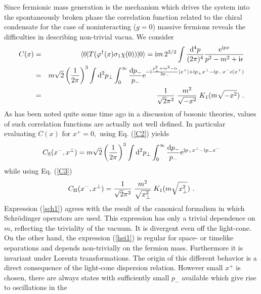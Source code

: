 \documentclass[a4paper,12pt]{article}
\begin{document}
Since fermionic mass generation is the mechanism which drives the system into the spontaneously
broken phase the correlation function related to the chiral condensate for the case of
noninteracting ($g=0$) massive fermions reveals the difficulties in describing non-trivial vacua.
We consider
\begin{eqnarray}
  \label{ corr}
  C(x)&=&\langle 0|T(\varphi^{\dagger}(x)\sigma_{1}\chi(0))| 0 \rangle= {\rm i}m\,
2^{3/2}\int \frac{{\rm d}^{4}p}{(2 \pi)^{4}}\frac{{\rm e}^{{\rm i}px}}{ p^{2} -m^{2}
+{\rm i} \epsilon}\label{C1}\\
&=&  m\sqrt{2}  \left ( \frac{1}{2\pi}
    \right )^{3} \int {\rm d}^{2} p_{\perp} \int^{\infty}_{0} \frac{{\rm d}p_{-}}{p_{-}}
{\rm e}^{- {\rm i} \frac{p^{2}_{\perp} + m^{2} - {\rm i} \epsilon}{2 p_{-}} |x^{+}|+
 {\rm i} p_{\perp}x^{\perp}-{\rm i} p_{-}x^{-} \epsilon (x^{+})}\label{C2}\\
& = &\frac{1}{\sqrt{2} \pi ^{2}} \; \frac{m^{2}}
     {\sqrt{- x^{2} }} \; K_{1} (m\sqrt{-x^{2}})\label{C3} \ .
\end{eqnarray}
As has been noted quite some time ago \cite{Nakanishi77} in a discussion of bosonic theories,
values of such correlation functions are actually not well defined. In particular  evaluating
$C(x)$ for $x^{+}=0,$  using  Eq. (\ref{C2}) yields
\begin{equation}
  \label{sch1}
C_{\rm S}(x^{-},x^{\perp})=  m\sqrt{2}  \left ( \frac{1}{2\pi}
    \right )^{3} \int {\rm d}^{2} p_{\perp} \int^{\infty}_{0} \frac{{\rm d}p_{-}}{p_{-}}
{\rm  e}^{{\rm i} p_{\perp}x^{\perp} - {\rm i} p_{-}x^{-} }
\end{equation}
while using Eq. (\ref{C3})
\begin{equation}
  \label{hei1}
C_{\rm H}(x^{-},x^{\perp}) =\frac{1}{\sqrt{2} \pi ^{2}} \; \frac{m^{2}}
     {\sqrt{ x_{\perp}^{2} }} \; K_{1} (m\sqrt{x_{\perp}
^{2}})\ .
\end{equation}
Expression (\ref{sch1}) agrees with the result of the canonical formalism in which Schr\"odinger
operators are used.  This expression has only a trivial dependence on $m$, reflecting the triviality
of the vacuum. It is divergent even off the light-cone. On the other hand, the expression (\ref{hei1})
is regular for space- or timelike separations and depends non-trivially on the fermion mass. Furthermore
it is invariant under Lorentz transformations. The origin of this different behavior is a direct
consequence of the
light-cone dispersion relation. However small $x^{+}$ is chosen, there are always
states with sufficiently small $p_{-}$ available which give rise to oscillations in the
\end{document}
